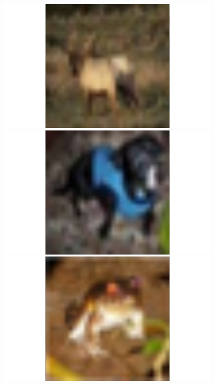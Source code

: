 \begin{figure}
\begin{minipage}{0.32\textwidth}
\begin{minipage}{0.18\textwidth}
  \end{minipage}
  \begin{minipage}{0.18\textwidth}
    \includegraphics[width=1.2\textwidth]{../plots/cifar10-class4}
  \end{minipage}
  \begin{minipage}{0.18\textwidth}
    \includegraphics[width=1.2\textwidth]{../plots/cifar10-class5}
  \end{minipage}
  \begin{minipage}{0.18\textwidth}
    \includegraphics[width=1.2\textwidth]{../plots/cifar10-class6}

\end{minipage}
\end{minipage}
\end{figure}
